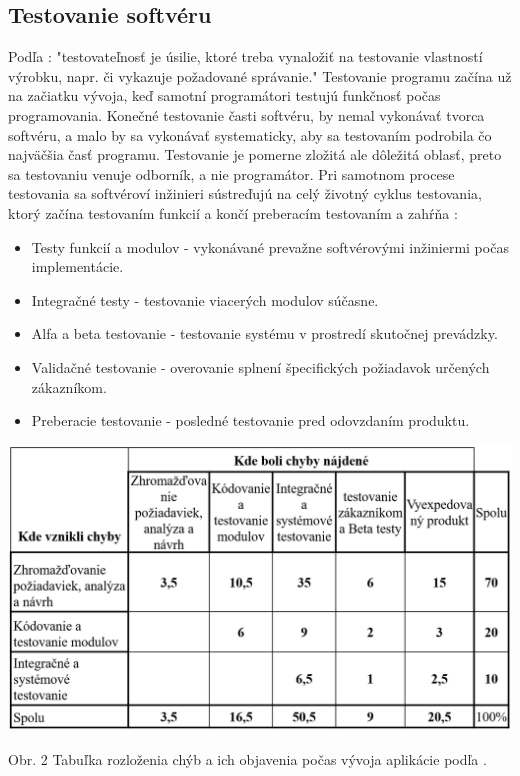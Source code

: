 \documentclass[10pt,twoside,slovak,a4paper]{article}
\begin{document}
\subsection{Testovanie softvéru} \label{testovanie}
 Podľa \cite{swemb}: "testovateľnosť je úsilie, ktoré treba vynaložiť na testovanie vlastností výrobku, napr. či vykazuje požadované správanie." Testovanie programu \cite{CSEroadmap} začína už na začiatku vývoja, keď samotní programátori testujú funkčnosť počas programovania. Konečné testovanie časti softvéru, by nemal vykonávať tvorca softvéru, a malo by sa vykonávať systematicky, aby sa testovaním podrobila čo najväčšia časť programu. Testovanie je pomerne zložitá ale dôležitá oblasť, preto sa testovaniu venuje odborník, a nie programátor.
Pri samotnom procese testovania sa softvéroví inžinieri sústreďujú na celý životný cyklus testovania, ktorý začína testovaním funkcií a končí preberacím testovaním a zahŕňa \cite{testovanie}:
\begin{itemize}
	\item Testy funkcií a modulov - vykonávané prevažne softvérovými inžiniermi počas implementácie.
	\item Integračné testy - testovanie viacerých modulov súčasne.
	\item Alfa a beta testovanie - testovanie systému v prostredí skutočnej prevádzky. 
    \item Validačné testovanie - overovanie splnení špecifických požiadavok určených zákazníkom.
    \item Preberacie testovanie - posledné testovanie pred odovzdaním produktu.
\end{itemize}

\begin{center}
   \includegraphics[scale=0.4]{tabulka.png} 
\end{center}
\begin{center}
    Obr. 2 Tabuľka rozloženia chýb a ich objavenia počas vývoja aplikácie podľa \cite{testovanie}.
\end{center}
\end{document}
